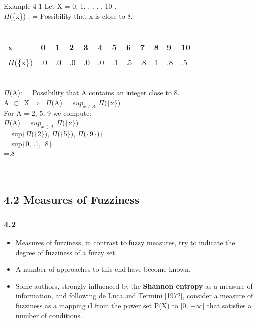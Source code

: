 \documentclass{beamer}
\begin{document}
\begin{CJK*}{UTF8}{bsmi}
\begin{frame}
\frametitle{}

\begin{block}{Example 4-1}
Let X = {0, 1, . . . , 10} .\\
$\Pi$(\{x\}) : = Possibility that x is close to 8.\\
~\\
\begin{table}[h]
\begin{tabular}{|l|l|l|l|l|l|l|l|l|l|l|l|}
\hline
x  & 0  & 1  & 2 & 3 & 4 & 5 & 6 & 7 & 8 & 9 & 10 \\ \hline
$\Pi$(\{x\}) & .0 & .0 & .0  & .0  & .0 & .1 & .5 & .8 & 1 & .8 & .5 \\ \hline
\end{tabular}
\end{table}
~\\
$\Pi$(A): = Possibility that A contains an integer close to 8.\\
A $\subset$~X$~ \Longrightarrow~$ $\Pi$(A) = $sup_{x \in A}$ $\Pi$(\{x\}) \\
For A = {2, 5, 9} we compute:\\
$\Pi$(A) = $sup_{x \in A}$ $\Pi$(\{x\}) \\
= sup\{$\Pi$(\{2\}), $\Pi$(\{5\}), $\Pi$(\{9\})\} \\
= sup\{0, .1, .8\}\\
=.8\\
~\\
~\\
\end{block}

\end{frame}


\subsection{4.2 Measures of Fuzziness} 


\begin{frame}
\frametitle{4.2}

\begin{itemize}
\item Measures of fuzziness, in contrast to fuzzy measures, try to indicate {\color{red}the degree of fuzziness of a fuzzy set.} 
\item A number of approaches to this end have become known. 
\item Some authors, strongly influenced by the \textbf{Shannon entropy} as a measure of information, and following de Luca and Termini [1972], consider a measure of fuzziness as {\color{red}a mapping \textbf{d} from the power set P(X) to [0, +\(\infty \)] that satisfies a number of conditions}.


\end{itemize}
\end{frame}
\end{CJK*}
\end{document}
